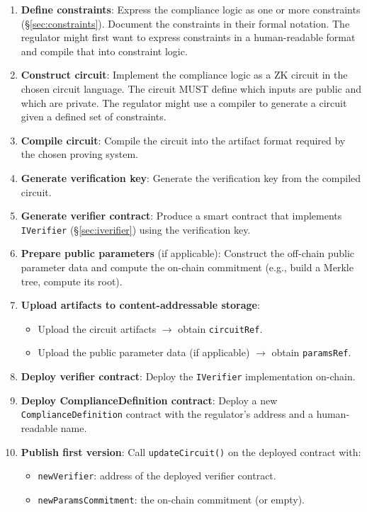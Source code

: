 \documentclass[9pt]{extreport}
\begin{document}
\begin{enumerate}
    \item \textbf{Define constraints}: Express the compliance logic as one or more constraints (\S\ref{sec:constraints}). Document the constraints in their formal notation. The regulator might first want to express constraints in a human-readable format and compile that into constraint logic.
    \item \textbf{Construct circuit}: Implement the compliance logic as a ZK circuit in the chosen circuit language. The circuit MUST define which inputs are public and which are private. The regulator might use a compiler to generate a circuit given a defined set of constraints.
    \item \textbf{Compile circuit}: Compile the circuit into the artifact format required by the chosen proving system.
    \item \textbf{Generate verification key}: Generate the verification key from the compiled circuit.
    \item \textbf{Generate verifier contract}: Produce a smart contract that implements \texttt{IVerifier} (\S\ref{sec:iverifier}) using the verification key.
    \item \textbf{Prepare public parameters} (if applicable): Construct the off-chain public parameter data and compute the on-chain commitment (e.g., build a Merkle tree, compute its root).
    \item \textbf{Upload artifacts to content-addressable storage}:
    \begin{itemize}
        \item Upload the circuit artifacts $\to$ obtain \texttt{circuitRef}.
        \item Upload the public parameter data (if applicable) $\to$ obtain \texttt{paramsRef}.
    \end{itemize}
    \item \textbf{Deploy verifier contract}: Deploy the \texttt{IVerifier} implementation on-chain.
    \item \textbf{Deploy ComplianceDefinition contract}: Deploy a new \texttt{ComplianceDefinition} contract with the regulator's address and a human-readable name.
    \item \textbf{Publish first version}: Call \texttt{updateCircuit()} on the deployed contract with:
    \begin{itemize}
        \item \texttt{newVerifier}: address of the deployed verifier contract.
        \item \texttt{newParamsCommitment}: the on-chain commitment (or empty).

\end{itemize}
\end{enumerate}
\end{document}
